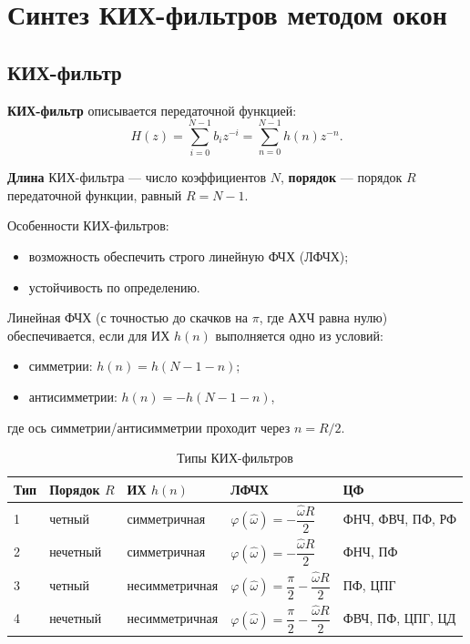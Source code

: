 \documentclass[a4paper, 14pt]{extarticle}
\begin{document}
\section{Синтез КИХ-фильтров методом окон}
\subsection{КИХ-фильтр}\label{subsec:fir}
\textbf{КИХ-фильтр} описывается передаточной функцией:
\begin{equation}
    H(z) = \sum^{N-1}_{i=0} b_i z^{-i} = \sum^{N-1}_{n=0} h(n)z^{-n}.
\end{equation}

\textbf{Длина} КИХ-фильтра --- число коэффициентов $N$, \textbf{порядок} --- порядок $R$ передаточной функции, равный $R=N-1$.

Особенности КИХ-фильтров:
\begin{itemize}
    \item возможность обеспечить строго линейную ФЧХ (ЛФЧХ);
    \item устойчивость по определению.
\end{itemize}

Линейная ФЧХ (с точностью до скачков на $\pi$, где АХЧ равна нулю) обеспечивается, если для ИХ $h(n)$ выполняется одно из условий:
\begin{itemize}
    \item симметрии: $h(n) = h(N - 1 - n)$;
    \item антисимметрии: $h(n) = -h(N-1-n)$,
\end{itemize}
где ось симметрии/антисимметрии проходит через $n=R/2$.


\begin{table}[h]
\centering
\caption{Типы КИХ-фильтров}
\begin{tabularx}{\textwidth}{@{}lllXl@{}}
\toprule
\textbf{Тип} & \textbf{Порядок $R$} & \textbf{ИХ $h(n)$} & \textbf{ЛФЧХ} & \textbf{ЦФ}      \\ \midrule
1            & четный               & симметричная       & $\varphi(\hat{\omega}) = - \dfrac{\hat{\omega}R}{2} $ & ФНЧ, ФВЧ, ПФ, РФ \\[12pt]
2            & нечетный             & симметричная       & $\varphi(\hat{\omega}) = - \dfrac{\hat{\omega}R}{2}$ & ФНЧ, ПФ          \\[12pt]
3            & четный               & несимметричная     & $ \varphi(\hat{\omega}) = \dfrac{\pi}{2} - \dfrac{\hat{\omega}R}{2}$ & ПФ, ЦПГ          \\[12pt]
4            & нечетный             & несимметричная     & $\varphi(\hat{\omega}) = \dfrac{\pi}{2} - \dfrac{\hat{\omega}R}{2}$ & ФВЧ, ПФ, ЦПГ, ЦД \\ \bottomrule
\end{tabularx}
\end{table}
\end{document}
